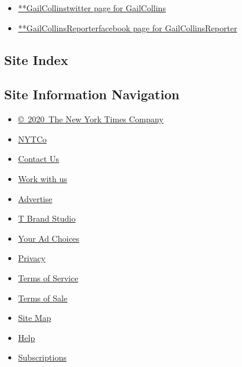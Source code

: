 \begin{itemize}
\tightlist
\item
  \href{https://twitter.com/GailCollins}{**GailCollinstwitter page for
  GailCollins}
\item
  \href{https://www.facebook.com/GailCollinsReporter}{**GailCollinsReporterfacebook
  page for GailCollinsReporter}
\end{itemize}

\hypertarget{site-index}{%
\subsection{Site Index}\label{site-index}}

\hypertarget{site-information-navigation}{%
\subsection{Site Information
Navigation}\label{site-information-navigation}}

\begin{itemize}
\tightlist
\item
  \href{https://help.nytimes.com/hc/en-us/articles/115014792127-Copyright-notice}{©~2020~The
  New York Times Company}
\end{itemize}

\begin{itemize}
\tightlist
\item
  \href{https://www.nytco.com/}{NYTCo}
\item
  \href{https://help.nytimes.com/hc/en-us/articles/115015385887-Contact-Us}{Contact
  Us}
\item
  \href{https://www.nytco.com/careers/}{Work with us}
\item
  \href{https://nytmediakit.com/}{Advertise}
\item
  \href{http://www.tbrandstudio.com/}{T Brand Studio}
\item
  \href{https://www.nytimes.com/privacy/cookie-policy\#how-do-i-manage-trackers}{Your
  Ad Choices}
\item
  \href{https://www.nytimes.com/privacy}{Privacy}
\item
  \href{https://help.nytimes.com/hc/en-us/articles/115014893428-Terms-of-service}{Terms
  of Service}
\item
  \href{https://help.nytimes.com/hc/en-us/articles/115014893968-Terms-of-sale}{Terms
  of Sale}
\item
  \href{https://spiderbites.nytimes.com}{Site Map}
\item
  \href{https://help.nytimes.com/hc/en-us}{Help}
\item
  \href{https://www.nytimes.com/subscription?campaignId=37WXW}{Subscriptions}
\end{itemize}
